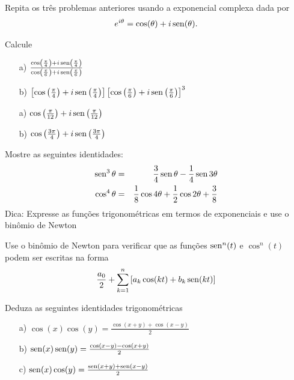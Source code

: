 \begin{Exercise}Repita os três problemas anteriores usando a exponencial complexa dada por
$$e^{i\theta}=\cos(\theta)+i\operatorname{sen}(\theta).$$
\end{Exercise}
\begin{Exercise} Calcule
\begin{itemize}
\item[a)] $\frac{\cos\left(\frac{\pi}{4}\right)+i\operatorname{sen}\left(\frac{\pi}{4}\right)}{\cos\left(\frac{\pi}{6}\right)+i\operatorname{sen}\left(\frac{\pi}{6}\right)}$
\item[b)] $\left[\cos\left(\frac{\pi}{4}\right)+i\operatorname{sen}\left(\frac{\pi}{4}\right)\right]\left[\cos\left(\frac{\pi}{6}\right)+i\operatorname{sen}\left(\frac{\pi}{6}\right)\right]^3$
\end{itemize}
\end{Exercise}
\begin{Answer} 
\begin{itemize}
\item[a)] $\cos\left(\frac{\pi}{12}\right)+i\operatorname{sen}\left(\frac{\pi}{12}\right)$
\item[b)] $\cos\left(\frac{3\pi}{4}\right)+i\operatorname{sen}\left(\frac{3\pi}{4}\right)$
\end{itemize}
\end{Answer}
\begin{Exercise}Mostre as seguintes identidades:
\begin{eqnarray*}
\operatorname{sen}^3\theta&=&\frac{3}{4}\operatorname{sen}\theta-\frac{1}{4}\operatorname{sen} 3\theta\\
\cos^4\theta&=&\frac{1}{8}\cos 4\theta+\frac{1}{2}\cos 2\theta+\frac{3}{8}
\end{eqnarray*}
Dica: Expresse as funções trigonométricas em termos de exponenciais e use o  binômio de Newton 
\end{Exercise}
\begin{Exercise}Use o binômio de Newton para verificar que as funções $\operatorname{sen}^n(t)$ e $\cos^n(t)$ podem ser escritas na forma 
$$\frac{a_0}{2}+\sum_{k=1}^n \left[a_k\cos(kt)+b_k\operatorname{sen}(kt)\right]$$
\end{Exercise}
\begin{Exercise} Deduza as seguintes identidades trigonométricas
\begin{itemize}
\item[a)] $\cos(x) \cos(y) = \frac {\cos(x+y) + \cos(x-y)}{2}$
\item[b)] $\operatorname{sen}(x) \operatorname{sen}(y) = \frac {\cos(x-y) - \cos(x+y)}{2}$
\item[c)] $\operatorname{sen}(x) \cos(y) = \frac {\operatorname{sen}(x+y) + \operatorname{sen}(x-y)}{2}$
\end{itemize}
\end{Exercise}
